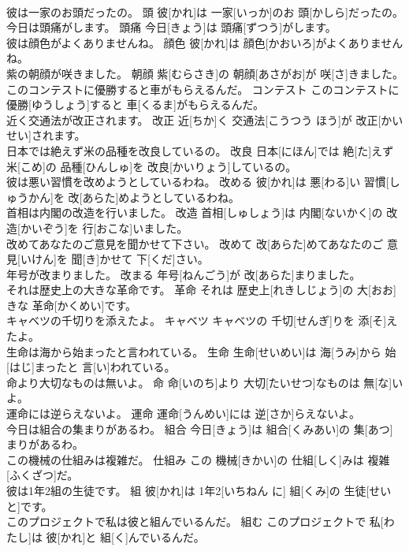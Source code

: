 \documentclass[8pt]{extreport}
\begin{document}
\begin{CJK}{UTF8}{min}
\\	彼は一家のお頭だったの。	頭	彼[かれ]は 一家[いっか]のお 頭[かしら]だったの。	
\\	今日は頭痛がします。	頭痛	今日[きょう]は 頭痛[ずつう]がします。	
\\	彼は顔色がよくありませんね。	顔色	彼[かれ]は 顔色[かおいろ]がよくありませんね。	
\\	紫の朝顔が咲きました。	朝顔	紫[むらさき]の 朝顔[あさがお]が 咲[さ]きました。	
\\	このコンテストに優勝すると車がもらえるんだ。	コンテスト	このコンテストに 優勝[ゆうしょう]すると 車[くるま]がもらえるんだ。	
\\	近く交通法が改正されます。	改正	近[ちか]く 交通法[こうつう ほう]が 改正[かいせい]されます。	
\\	日本では絶えず米の品種を改良しているの。	改良	日本[にほん]では 絶[た]えず 米[こめ]の 品種[ひんしゅ]を 改良[かいりょう]しているの。	
\\	彼は悪い習慣を改めようとしているわね。	改める	彼[かれ]は 悪[わる]い 習慣[しゅうかん]を 改[あらた]めようとしているわね。	
\\	首相は内閣の改造を行いました。	改造	首相[しゅしょう]は 内閣[ないかく]の 改造[かいぞう]を 行[おこな]いました。	
\\	改めてあなたのご意見を聞かせて下さい。	改めて	改[あらた]めてあなたのご 意見[いけん]を 聞[き]かせて 下[くだ]さい。	
\\	年号が改まりました。	改まる	年号[ねんごう]が 改[あらた]まりました。	
\\	それは歴史上の大きな革命です。	革命	それは 歴史上[れきしじょう]の 大[おお]きな 革命[かくめい]です。	
\\	キャベツの千切りを添えたよ。	キャベツ	キャベツの 千切[せんぎ]りを 添[そ]えたよ。	
\\	生命は海から始まったと言われている。	生命	生命[せいめい]は 海[うみ]から 始[はじ]まったと 言[い]われている。	
\\	命より大切なものは無いよ。	命	命[いのち]より 大切[たいせつ]なものは 無[な]いよ。	
\\	運命には逆らえないよ。	運命	運命[うんめい]には 逆[さか]らえないよ。	
\\	今日は組合の集まりがあるわ。	組合	今日[きょう]は 組合[くみあい]の 集[あつ]まりがあるわ。	
\\	この機械の仕組みは複雑だ。	仕組み	この 機械[きかい]の 仕組[しく]みは 複雑[ふくざつ]だ。	
\\	彼は1年2組の生徒です。	組	彼[かれ]は 1年2[いちねん に] 組[くみ]の 生徒[せいと]です。	
\\	このプロジェクトで私は彼と組んでいるんだ。	組む	このプロジェクトで 私[わたし]は 彼[かれ]と 組[く]んでいるんだ。	

\end{CJK}
\end{document}
